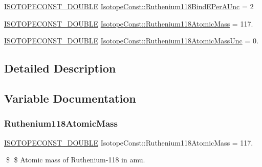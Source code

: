 \begin{DoxyCompactItemize}
\mbox{\hyperlink{group___isotope_const-_macros_ga8f45a7272ce02c0b4c65c44636ed719a}{I\+S\+O\+T\+O\+P\+E\+C\+O\+N\+S\+T\+\_\+\+D\+O\+U\+B\+LE}} \mbox{\hyperlink{group___isotope_const-_ruthenium-_ru118_ga34cbf0fb89ad34ef8adb2f7749829995}{Isotope\+Const\+::\+Ruthenium118\+Bind\+E\+Per\+A\+Unc}} = 2
\item 
\mbox{\hyperlink{group___isotope_const-_macros_ga8f45a7272ce02c0b4c65c44636ed719a}{I\+S\+O\+T\+O\+P\+E\+C\+O\+N\+S\+T\+\_\+\+D\+O\+U\+B\+LE}} \mbox{\hyperlink{group___isotope_const-_ruthenium-_ru118_gacc3b8d131e9227c1506a4c8d9d78f798}{Isotope\+Const\+::\+Ruthenium118\+Atomic\+Mass}} = 117.
\item 
\mbox{\hyperlink{group___isotope_const-_macros_ga8f45a7272ce02c0b4c65c44636ed719a}{I\+S\+O\+T\+O\+P\+E\+C\+O\+N\+S\+T\+\_\+\+D\+O\+U\+B\+LE}} \mbox{\hyperlink{group___isotope_const-_ruthenium-_ru118_ga086ce48d5e6252fc66f15682bc1db832}{Isotope\+Const\+::\+Ruthenium118\+Atomic\+Mass\+Unc}} = 0.
\end{DoxyCompactItemize}


\subsection{Detailed Description}


\subsection{Variable Documentation}
\mbox{\label{group___isotope_const-_ruthenium-_ru118_gacc3b8d131e9227c1506a4c8d9d78f798}} 
\subsubsection{\texorpdfstring{Ruthenium118\+Atomic\+Mass}{Ruthenium118AtomicMass}}
{\footnotesize\ttfamily \mbox{\hyperlink{group___isotope_const-_macros_ga8f45a7272ce02c0b4c65c44636ed719a}{I\+S\+O\+T\+O\+P\+E\+C\+O\+N\+S\+T\+\_\+\+D\+O\+U\+B\+LE}} Isotope\+Const\+::\+Ruthenium118\+Atomic\+Mass = 117.}

\$ \$ Atomic mass of Ruthenium-\/118 in amu. \mbox{\label{group___isotope_const-_ruthenium-_ru118_ga086ce48d5e6252fc66f15682bc1db832}} 
